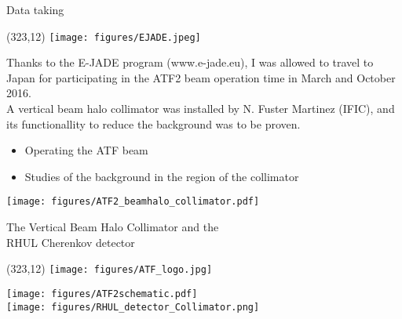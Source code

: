 \documentclass[xcolor={dvipsnames}]{beamer}
\newcommand{\ejadelogo}{
  \setlength{\TPHorizModule}{1pt}
  \setlength{\TPVertModule}{1pt}
  \begin{textblock}{1}(323,12)
   \texttt{[image: figures/EJADE.jpeg]}
  \end{textblock}
}
\newcommand{\ATFlogo}{
  \setlength{\TPHorizModule}{1pt}
  \setlength{\TPVertModule}{1pt}
  \begin{textblock}{1}(323,12)
   \texttt{[image: figures/ATF\_logo.jpg]}
  \end{textblock}
}
\begin{document}
\begin{frame}{Data taking}
\ejadelogo
Thanks to the E-JADE program {\tiny(www.e-jade.eu)}, I was allowed to travel to Japan for participating in the ATF2 beam operation time in March and October 2016.\\
A vertical beam halo collimator was installed by N. Fuster Martinez (IFIC), and its functionallity to reduce the background was to be proven.
\begin{itemize}
\item Operating the ATF beam
\item Studies of the background in the region of the collimator
\end{itemize}
\begin{center}
\texttt{[image: figures/ATF2\_beamhalo\_collimator.pdf]}
\end{center}
\end{frame}
\begin{frame}{The Vertical Beam Halo Collimator and the\\RHUL Cherenkov detector}
\ATFlogo
\begin{center}
\texttt{[image: figures/ATF2schematic.pdf]}\\
  \texttt{[image: figures/RHUL\_detector\_Collimator.png]}
\end{center}
\end{frame}
\end{document}
